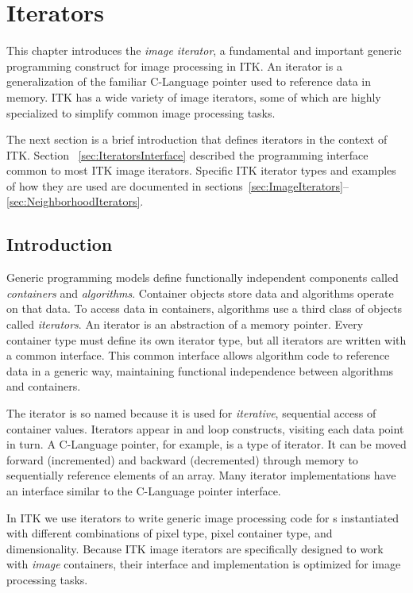 \chapter{Iterators}
\label{sec:ImageIteratorsChapter}
This chapter introduces the \emph{image iterator}, a fundamental and important
generic programming construct for image processing in ITK.  An iterator is a
generalization of the familiar C-Language pointer used to reference data in
memory.  ITK has a wide variety of image iterators, some of which are highly
specialized to simplify common image processing tasks.

The next section is a brief introduction that defines iterators in the context
of ITK.  Section ~\ref{sec:IteratorsInterface} described the programming
interface common to most ITK image iterators.  Specific ITK iterator types and
examples of how they are used are documented in
sections~\ref{sec:ImageIterators}--\ref{sec:NeighborhoodIterators}.

\section{Introduction}
\label{sec:IteratorsIntroduction}
Generic programming models define functionally independent components called
\emph{containers} and \emph{algorithms}.  Container objects store data and
algorithms operate on that data.  To access data in containers, algorithms use
a third class of objects called \emph{iterators}.  An iterator is an
abstraction of a memory pointer.  Every container type must define its own
iterator type, but all iterators are written with a common interface.  This
common interface allows algorithm code to reference data in a generic way,
maintaining functional independence between algorithms and containers.

The iterator is so named because it is used for \emph{iterative}, sequential
access of container values.  Iterators appear in  and
 loop constructs, visiting each data point in turn.  A C-Language pointer,
for example, is a type of iterator.  It can be moved forward (incremented) and
backward (decremented) through memory to sequentially reference elements of an
array. Many iterator implementations have an interface similar to the
C-Language pointer interface. 

In ITK we use iterators to write generic image processing code for
s instantiated with different combinations of pixel type, pixel
container type, and dimensionality.  Because ITK image iterators are
specifically designed to work with \emph{image} containers, their interface and
implementation is optimized for image processing tasks.

